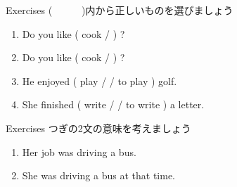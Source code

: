 \documentclass[aspectratio=169,xcolor={dvipsnames,table}]{beamer}
\begin{document}
\begin{frame}[plain]{Exercises}
(~~~~~~)内から正しいものを選びましょう%
\hfill{\scriptsize {}}
 \begin{enumerate}
  \item Do you like ( cook /  ) ?
  \item Do you like ( cook /  ) ?
  \item He enjoyed ( play /  / to play ) golf.
  \item She finished ( write /  / to write ) a letter.
 \end{enumerate}
\end{frame}
\begin{frame}[plain]{Exercises}
つぎの2文の意味を考えましょう\,\,\textdbend\textdbend

 \begin{enumerate}
  \item Her job was driving a bus.
  \item She was driving a bus at that time.
 \end{enumerate}
%
\hfill{\scriptsize {}}
\end{frame}
\end{document}
